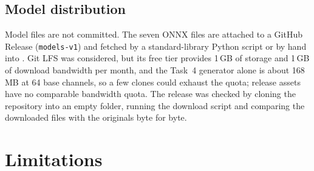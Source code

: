 \documentclass[conference]{IEEEtran}
\DeclareRobustCommand{\file}[1]{\expandafter\filepath\expandafter{\detokenize{#1}}}
\begin{document}
\subsection{Model distribution}
Model files are not committed. The seven ONNX files are attached to a
GitHub Release (\texttt{models-v1}) and fetched by a standard-library Python
script or by hand into \file{models/}. Git LFS was considered, but its free
tier provides 1\,GB of storage and 1\,GB of download bandwidth per month,
and the Task~4 generator alone is about 168\,MB at 64 base channels, so a
few clones could exhaust the quota; release assets have no comparable
bandwidth quota.
The release was checked by cloning the repository into an empty folder,
running the download script and comparing the downloaded files with the
originals byte for byte.

\section{Limitations}
\label{sec:limitations}
\end{document}
